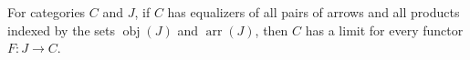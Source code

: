 For categories $C$ and $J$, if $C$ has equalizers of all pairs of arrows and all products indexed by the sets $\operatorname{obj}(J)$ and $\operatorname{arr}(J)$, then $C$ has a limit for every functor $F: J \rightarrow C$.
